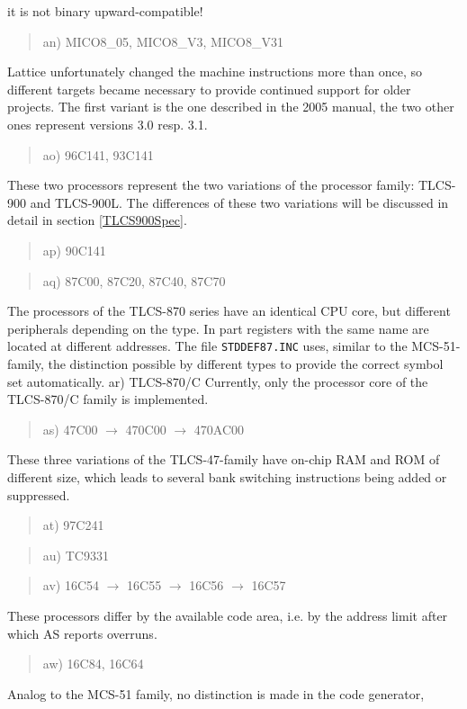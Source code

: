 \documentclass[12pt,twoside]{report}
\newcommand{\tty}[1]{{\tt #1}}
\begin{document}
it is not binary upward-compatible!
\begin{quote}
an) MICO8\_05, MICO8\_V3, MICO8\_V31
\end{quote}
Lattice unfortunately changed the machine instructions more than once, so
different targets became necessary to provide continued support for older
projects.  The first variant is the one described in the 2005 manual, the
two other ones represent versions 3.0 resp. 3.1.
\begin{quote}
ao) 96C141, 93C141
\end{quote}
These two processors represent the two variations of the processor
family: TLCS-900 and TLCS-900L.  The differences of these two variations
will be discussed in detail in section \ref{TLCS900Spec}.
\begin{quote}
ap) 90C141
\end{quote}
\begin{quote}
aq) 87C00, 87C20, 87C40, 87C70
\end{quote}
The processors of the TLCS-870 series have an identical CPU core, but
different peripherals depending on the type.  In part registers with
the same name are located at different addresses.  The file
\tty{STDDEF87.INC} uses, similar to the MCS-51-family, the distinction
possible by different types to provide the correct symbol set
automatically.
ar) TLCS-870/C
Currently, only the processor core of the TLCS-870/C family is
implemented.
\begin{quote}
as) 47C00 $\rightarrow$ 470C00 $\rightarrow$ 470AC00
\end{quote}
These three variations of the TLCS-47-family have on-chip RAM and ROM
of different size, which leads to several bank switching instructions
being added or suppressed.
\begin{quote}
at) 97C241
\end{quote}
\begin{quote}
au) TC9331
\end{quote}
\begin{quote}
av) 16C54 $\rightarrow$ 16C55 $\rightarrow$ 16C56 $\rightarrow$ 16C57
\end{quote}
These processors differ by the available code area, i.e. by the address
limit after which AS reports overruns.
\begin{quote}
aw) 16C84, 16C64
\end{quote}
Analog to the MCS-51 family, no distinction is made in the code generator,
\end{document}
